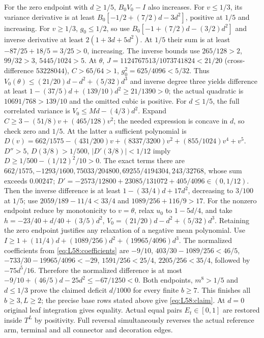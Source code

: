 For the zero endpoint with $d\ge1/5$, $B_0V_0-I$ also increases.
For $v\le1/3$, its variance derivative is at least
$B_0[-1/2+(7/2)d-3d^2]$, positive at $1/5$ and increasing.
For $v\ge1/3$, $g_0\le1/2$, so use
$B_0[-1+(7/2)d-(3/2)d^2]$ and inverse derivative at least
$2(1+3d+5d^2)$.
At $1/5$ their sum is at least $-87/25+18/5=3/25>0$, increasing.
The inverse bounds use $265/128>2$, $99/32>3$, $5445/1024>5$.
At $\theta$, $J=1124767513/1073741824<21/20$
(cross-difference $53228044$), $C>65/64>1$,
$g_0^2=625/4096<5/32$.
Thus $V_0(\theta)\le(21/20)d-d^2+(5/32)d^3$ and inverse degree
three yields difference at least
$1-(37/5)d+(139/10)d^2\ge21/1390>0$;
the actual quadratic is $10691/768>139/10$ and the omitted cubic is
positive.
For $d\le1/5$, the full correlated variance is
$V_0\le Md-(4/3)d^2$.
Expand $C\ge3-(51/8)v+(465/128)v^2$;
the needed expression is concave in $d$, so check zero and $1/5$.
At the latter a sufficient polynomial is
$D(v)=662/1575-(431/200)v+(8337/3200)v^2+(855/1024)v^4+v^5$.
$D''>5$, $D(3/8)>1/500$, $|D'(3/8)|<1/12$ imply
$D\ge1/500-(1/12)^2/10>0$.
The exact terms there are
$662/1575,\allowbreak -1293/1600,\allowbreak 75033/204800,\allowbreak 69255/4194304,\allowbreak 243/32768$,
whose sum exceeds $0.00247$;
$D'=-2573/12800+23085/131072+405/4096\in(0,1/12)$.
Then the inverse difference is at least
$1-(33/4)d+17d^2$, decreasing to $3/100$ at $1/5$;
use $2059/189-11/4<33/4$ and $1089/256+116/9>17$.
For the nonzero endpoint reduce by monotonicity to $v=\theta$,
relax $u_0$ to $1-5d/4$, and take
$h=-23/40+d/40+(3/5)d^2$,
$V_0=(21/20)d-d^2+(5/32)d^3$.
Retaining the zero endpoint justifies any relaxation of a negative
mean polynomial. Use
$I\ge1+(11/4)d+(1089/256)d^2+(19965/4096)d^3$.
The normalized coefficients from \eqref{eq:L58:coefficients} are
$-9/10$, $403/30-1089/256<46/5$,
$-733/30-19965/4096<-29$, $1591/256<25/4$,
$2205/256<35/4$, followed by $-75d^5/16$.
Therefore the normalized difference is at most
$-9/10+(46/5)d-25d^2\le-67/1250<0$.
Both endpoints, $m^8>1/5$ and $d\le1/3$ prove the claimed deficit
$d/1000$ for every finite $b\ge7$.
This finishes all $b\ge3,L\ge2$; the precise base rows stated above
give \eqref{eq:L58:claim}. At $d=0$ original leaf integration gives
equality. Actual equal pairs $E_t\in[0,1]$ are restored inside $T^L$
by positivity. Full reversal simultaneously reverses the actual
reference arm, terminal and all connector and decoration edges.
